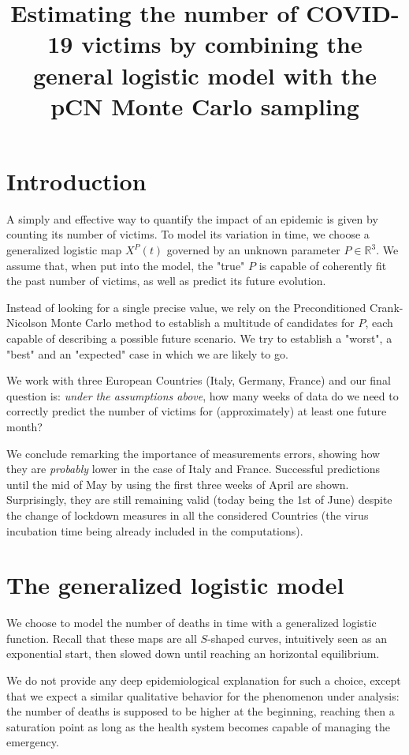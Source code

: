 \documentclass[8pt]{article}
\title {Estimating the number of COVID-19 victims by combining the
general logistic model with the pCN Monte Carlo sampling}
\begin{document}
\maketitle
\section{Introduction}
A simply and effective way to quantify the impact of an epidemic
is given by counting its number of victims.
To model its variation in time, we choose
a generalized logistic map $X^P(t)$ governed by an unknown parameter 
$P \in \mathbb{R}^3$. We assume that, when put into the model,
the "true" $P$ is capable of coherently fit the past number of
victims, as well as predict its future evolution.


Instead of looking for a single precise value, we rely on
the Preconditioned Crank-Nicolson Monte Carlo method
to establish a multitude of candidates for $P$, 
each capable of describing a possible future scenario.
We try to establish a "worst", a "best" and an "expected"
case in which we are likely to go.


We work with three European Countries
(Italy, Germany, France) and our final question is:
\emph{under the assumptions above},
how many weeks of data do we need to correctly predict 
the number of victims for (approximately) at least one future month?


We conclude remarking the importance of measurements errors,
showing how they are \emph{probably} lower in the case of Italy and France.
Successful predictions until the mid of May by using the first three
weeks of April are shown. Surprisingly, they are still remaining
valid (today being the 1st of June) despite the change of
lockdown measures in all the considered Countries (the virus
incubation time being already included in the computations).

\section {The generalized logistic model}
We choose to model the number of deaths in time with a
generalized logistic function. 
Recall that these maps are all
$S$-shaped curves, intuitively seen as an exponential start,
then slowed down until reaching an horizontal equilibrium. 


We do not provide any deep epidemiological explanation for such a choice,
except that we expect a similar qualitative behavior for the phenomenon
under analysis: the number of deaths is supposed to be higher at the beginning,
reaching then a saturation point as long as the health system becomes
capable of managing the emergency.
\end{document}
